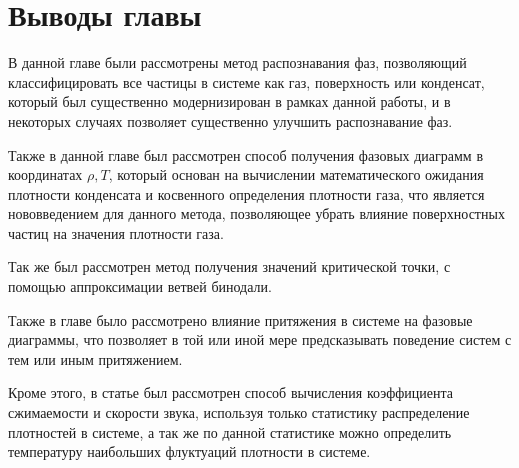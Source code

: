 \section{Выводы главы}\label{C2_4}

В данной главе были рассмотрены метод распознавания фаз, позволяющий классифицировать все частицы в системе как газ, поверхность или конденсат, который был существенно модернизирован в рамках данной работы, и в некоторых случаях позволяет существенно улучшить распознавание фаз. 

Также в данной главе был рассмотрен способ получения фазовых диаграмм в координатах $\rho, T$, который основан на вычислении математического ожидания плотности конденсата и косвенного определения плотности газа, что является нововведением для данного метода, позволяющее убрать влияние поверхностных частиц на значения плотности газа. 

Так же был рассмотрен метод получения значений критической точки, с помощью аппроксимации ветвей бинодали. 

Также в главе было рассмотрено влияние притяжения в системе на фазовые диаграммы, что позволяет в той или иной мере предсказывать поведение систем с тем или иным притяжением.

Кроме этого, в статье был рассмотрен способ вычисления коэффициента сжимаемости и скорости звука, используя только статистику распределение плотностей в системе, а так же по данной статистике можно определить температуру наибольших флуктуаций плотности в системе.